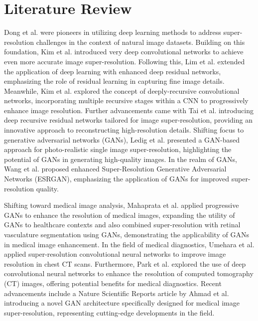 \documentclass[10pt,twocolumn,letterpaper]{article}
\begin{document}


\section{Literature Review}
Dong et al. \cite{dong2015image} were pioneers in utilizing deep learning methods to address super-resolution challenges in the context of natural image datasets. Building on this foundation, Kim et al. \cite{kim2016accurate} introduced very deep convolutional networks to achieve even more accurate image super-resolution. Following this, Lim et al. \cite{lim2017enhanced} extended the application of deep learning with enhanced deep residual networks, emphasizing the role of residual learning in capturing fine image details. Meanwhile, Kim et al. \cite{kim2016deeply} explored the concept of deeply-recursive convolutional networks, incorporating multiple recursive stages within a CNN to progressively enhance image resolution. Further advancements came with Tai et al. \cite{tai2017image} introducing deep recursive residual networks tailored for image super-resolution, providing an innovative approach to reconstructing high-resolution details. Shifting focus to generative adversarial networks (GANs), Ledig et al. \cite{ledig2017photo} presented a GAN-based approach for photo-realistic single image super-resolution, highlighting the potential of GANs in generating high-quality images. In the realm of GANs, Wang et al. \cite{wang2018esrgan} proposed enhanced Super-Resolution Generative Adversarial Networks (ESRGAN), emphasizing the application of GANs for improved super-resolution quality. 

Shifting toward medical image analysis, Mahaprata et al. \cite{mahapatra2019image} \cite{mahapatra2017retinal} applied progressive GANs to enhance the resolution of medical images, expanding the utility of GANs to healthcare contexts and also combined super-resolution with retinal vasculature segmentation using GANs, demonstrating the applicability of GANs in medical image enhancement. In the field of medical diagnostics, Umehara et al. \cite{umehara2018application} applied super-resolution convolutional neural networks to improve image resolution in chest CT scans. Furthermore, Park et al. \cite{park2018computed} explored the use of deep convolutional neural networks to enhance the resolution of computed tomography (CT) images, offering potential benefits for medical diagnostics. Recent advancements include a Nature Scientific Reports article by Ahmad et al. \cite{ahmad_nature} introducing a novel GAN architecture specifically designed for medical image super-resolution, representing cutting-edge developments in the field. 
\end{document}
